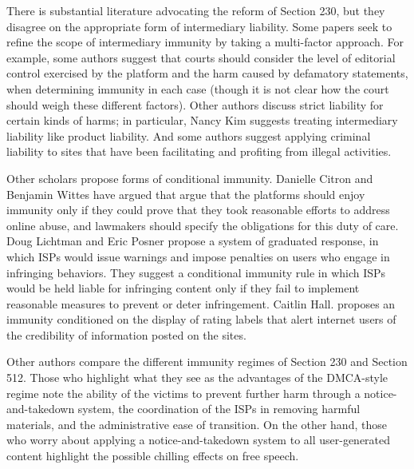 There is substantial literature advocating the reform of Section 230, but they disagree on the appropriate form of intermediary liability. Some papers seek to refine the scope of intermediary immunity by taking a multi-factor approach. For example, some authors suggest that courts should consider the level of editorial control exercised by the platform and the harm caused by defamatory statements, when determining immunity in each case (though it is not clear how the court should weigh these different factors). Other authors discuss  strict liability for certain kinds of harms; in particular, Nancy Kim suggests treating intermediary liability like product liability. And some authors suggest applying criminal liability to sites that have been facilitating and profiting from illegal activities.

Other scholars propose forms of conditional immunity. Danielle Citron and Benjamin Wittes have argued that argue that the platforms should enjoy immunity only if they could prove that they took reasonable efforts to address online abuse, and lawmakers should specify the obligations for this duty of care.  Doug Lichtman and Eric Posner propose a system of graduated response, in which ISPs would issue warnings and impose penalties on users who engage in infringing behaviors.  They suggest a conditional immunity rule in which ISPs would be held liable for infringing content only if they fail to implement reasonable measures to prevent or deter infringement. Caitlin Hall. proposes an immunity conditioned on the display of rating labels that alert internet users of the credibility of information posted on the sites.

Other authors compare the different immunity regimes of Section 230 and Section 512.  Those who highlight what they see as the advantages of the DMCA-style regime note the ability of the victims to prevent further harm through a notice-and-takedown system, the coordination of the ISPs in removing harmful materials, and the administrative ease of transition.  On the other hand, those who worry about applying a notice-and-takedown system to all user-generated content highlight the possible chilling effects on free speech.

